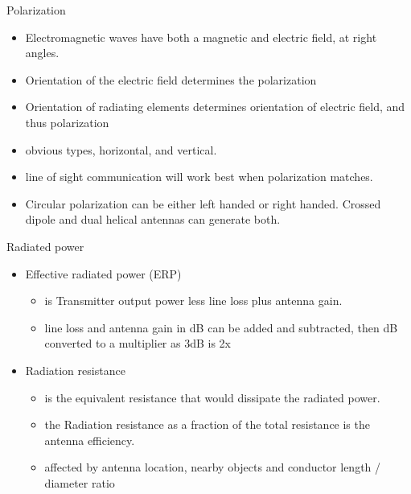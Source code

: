 \documentclass{beamer}
\begin{document}
\begin{frame}{Polarization}{}
\begin{itemize}
\item Electromagnetic waves have both a magnetic and electric field, at right angles.
\item Orientation of the electric field determines the polarization
\item Orientation of radiating elements determines orientation of electric field, and thus polarization
\item obvious types, horizontal, and vertical.  
\item line of sight communication will work best when polarization matches.
\item Circular polarization can be either left handed or right handed.  Crossed dipole and dual helical antennas can generate both.
\end{itemize}
\end{frame}

\begin{frame}{Radiated power}{}
\begin{itemize}
\item Effective radiated power (ERP)  
\begin{itemize}
\item is Transmitter output power less line loss plus antenna gain.
\item line loss and antenna gain in dB can be added and subtracted, then dB converted to a multiplier as 3dB is 2x
\end{itemize}
\item Radiation resistance 
\begin{itemize}
\item is the equivalent resistance that would dissipate the radiated power.
\item the Radiation resistance as a fraction of the total resistance is the antenna efficiency.
\item affected by antenna location, nearby objects and conductor length / diameter ratio

\end{itemize}

\end{itemize}
\end{frame}






\end{document}
